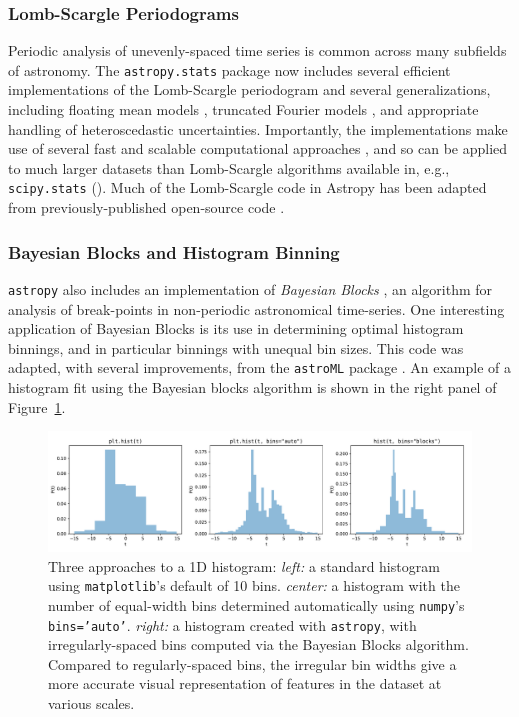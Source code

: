 \documentclass[modern]{aastex61}
\newcommand{\package}[1]{\texttt{#1}\xspace}
\newcommand{\astropy}{Astropy\xspace}
\newcommand{\astropypkg}{\package{astropy}}
\renewcommand{\figurename}{Figure\xspace}
\begin{document}
\subsubsection{Lomb-Scargle Periodograms}

Periodic analysis of unevenly-spaced time series is common across many subfields of astronomy. The \package{astropy.stats} package now includes several efficient implementations of the Lomb-Scargle periodogram \citep{Lomb76, Scargle82} and several generalizations, including floating mean models \citep{Zechmeister09}, truncated Fourier models \citep{Bretthorst2003}, and appropriate handling of heteroscedastic uncertainties. Importantly, the implementations make use of several fast and scalable computational approaches \citep[e.g.,][]{Press89, Palmer09}, and so can be applied to much larger datasets than Lomb-Scargle algorithms available in, e.g., \package{scipy.stats} (\citealt{scipy}). Much of the Lomb-Scargle code in \astropy has been adapted from previously-published open-source code \citep{astroML, VanderPlas2015}.

\subsubsection{Bayesian Blocks and Histogram Binning}
\astropypkg also includes an implementation of {\it Bayesian Blocks} \citep{Scargle2013}, an algorithm for analysis of break-points in non-periodic astronomical time-series. One interesting application of Bayesian Blocks is its use in determining optimal histogram binnings, and in particular binnings with unequal bin sizes. This code was adapted, with several improvements, from the \package{astroML} package \citep{astroML}. An example of a histogram fit using the Bayesian blocks algorithm is shown in the right panel of \figurename~\ref{fig:bayes-blocks-hist}.

\begin{figure}
\includegraphics[width=\textwidth]{bayesian_blocks_hist.pdf}
\caption{%
    Three approaches to a 1D histogram:
    {\it left:} a standard histogram using \package{matplotlib}'s default of 10 bins.
    {\it center:} a histogram with the number of equal-width bins determined automatically using \package{numpy}'s {\tt bins='auto'}.
    {\it right:} a histogram created with \package{astropy}, with irregularly-spaced bins computed via the Bayesian Blocks algorithm.
    Compared to regularly-spaced bins, the irregular bin widths give a more accurate visual representation of features in the dataset at various scales.
    \label{fig:bayes-blocks-hist}
}
\end{figure}
\end{document}
